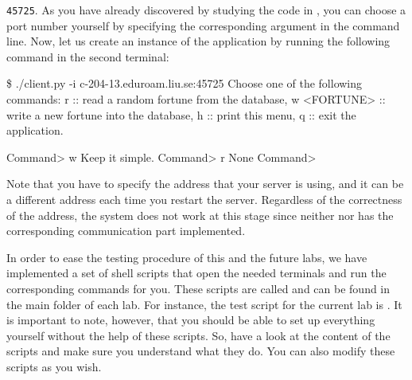 \documentclass[a4paper]{article}
\begin{document}
\texttt{45725}. As you have already discovered by studying the code in
, you can choose a port number yourself by specifying the
corresponding argument in the command line. Now, let us create an instance of
the  application by running the following command in the
second terminal:
\begin{shell}
\$ ./client.py -i c-204-13.eduroam.liu.se:45725
Choose one of the following commands:
    r            ::  read a random fortune from the database,
    w <FORTUNE>  ::  write a new fortune into the database,
    h            ::  print this menu,
    q            ::  exit the application.

Command> w Keep it simple.
Command> r
None
Command>
\end{shell}
Note that you have to specify the address that your server is using, and it can
be a different address each time you restart the server. Regardless of the
correctness of the address, the system does not work at this stage since neither
 nor  has the corresponding communication
part implemented.

In order to ease the testing procedure of this and the future labs, we have
implemented a set of shell scripts that open the needed terminals and run the
corresponding commands for you. These scripts are called  and
can be found in the main folder of each lab. For instance, the test script for
the current lab is . It is important to note, however,
that you should be able to set up everything yourself without the help of these
scripts. So, have a look at the content of the scripts and make sure you
understand what they do. You can also modify these scripts as you wish.
\end{document}
